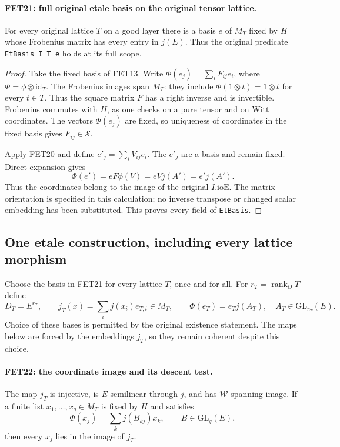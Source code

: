 \documentclass[11pt,a4paper]{article}
\numberwithin{equation}{section}
\theoremstyle{remark}\newtheorem{remark}[theorem]{Remark}
\begin{document}
\paragraph{FET21: full original etale basis on the original tensor lattice.}
\label{claim:FET21}
For every original lattice $T$ on a good layer there is a basis
$e$ of $M_T$ fixed by $H$ whose Frobenius matrix has every
entry in $j(E)$. Thus the original predicate \texttt{Et\allowbreak Basis I T e}
holds at its full scope.

\begin{proof}
Take the fixed basis of FET13. Write
$\Phi(e_j)=\sum_i F_{ij}e_i$, where
$\Phi=\phi\otimes\mathrm{id}_T$.
The Frobenius images span $M_T$: they include
$\Phi(1\otimes t)=1\otimes t$ for every $t\in T$.
Thus the square matrix $F$ has a right inverse and is invertible.
Frobenius commutes with $H$, as one checks on a pure tensor
and on Witt coordinates. The vectors $\Phi(e_j)$ are fixed,
so uniqueness of coordinates in the fixed basis gives
$F_{ij}\in\mathcal S$.

Apply FET20 and define $e'_j=\sum_i V_{ij}e_i$.
The $e'_j$ are a basis and remain fixed. Direct expansion gives
\[
 \Phi(e')=eF\phi(V)=eVj(A')=e'j(A').
\]
Thus the coordinates belong to the image of the original
$I.\mathrm{ioE}$. The matrix orientation is specified in this
calculation; no inverse transpose or changed scalar embedding
has been substituted. This proves every field of \texttt{Et\allowbreak Basis}.
\end{proof}

\subsection{One etale construction, including every lattice morphism}

Choose the basis in FET21 for every lattice $T$, once and for all.
For $r_T=\operatorname{rank}_O T$ define
\[
 D_T=E^{r_T},\qquad
 j_T(x)=\sum_i j(x_i)e_{T,i}\in M_T,
 \qquad \Phi(e_T)=e_Tj(A_T),\quad A_T\in\mathrm{GL}_{r_T}(E).
                                                               \tag{FET.20}
\]
Choice of these bases is permitted by the original existence
statement. The maps below are forced by the embeddings $j_T$, so
they remain coherent despite this choice.

\paragraph{FET22: the coordinate image and its descent test.}
\label{claim:FET22}
The map $j_T$ is injective, is $E$-semilinear through $j$, and
has $\mathcal W$-spanning image. If a finite list
$x_1,\ldots,x_q\in M_T$ is fixed by $H$ and satisfies
\[
       \Phi(x_j)=\sum_k j(B_{kj})x_k,\qquad B\in\mathrm{GL}_q(E),
                                                               \tag{FET.21}
\]
then every $x_j$ lies in the image of $j_T$.
\end{document}
